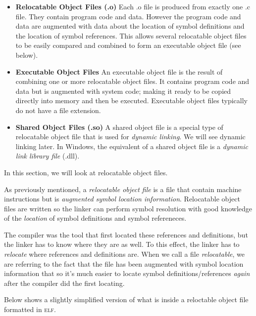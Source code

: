 \begin{itemize}   
\renewcommand{\labelitemi}{$\Box$}
\item \textbf{Relocatable Object Files (.o)} 
Each .o file is produced from exactly one .c file. They contain program code and data. 
However the program code and data are augmented with data about the location of symbol 
definitions and the location of symbol references. 
This allows several relocatable object files to be easily compared and combined to form an 
executable object file (see below).
\item \textbf{Executable Object Files} 
An executable object file is the result of combining one or more relocatable object files. 
It contains program code and data but is augmented with 
system code; making it ready to be copied directly into memory and then be executed. 
Executable object files typically do not have a file extension. 
\item \textbf{Shared Object Files (.so)} 
A shared object file is a special type of relocatable object 
file that is used for \textit{dynamic linking}. We will see dynamic linking later. 
In Windows, the equivalent of a shared object file is a \textit{dynamic link library file} (.dll).  
\end{itemize}


In this section, we will look at relocatable object files. 

As previously mentioned, 
a \textit{relocatable object file} is a file that contain machine instructions but is
\textit{augmented symbol location information}. Relocatable object files are written
so the linker can perform symbol resolution with good knowledge of the \textit{location} 
of symbol definitions and symbol refereneces.



The compiler was the tool that first located these references and definitions, 
but the linker has to know where they are as well. To this effect, the linker 
has to \textit{relocate} where references and definitions are. When we 
call a file \textit{relocatable}, we are referring to the fact that the file 
has been augmented with symbol location information that so it's much easier 
to locate symbol definitions/references \textit{again} 
after the compiler did the first locating.


Below shows a slightly simplified version of what is inside 
a reloctable object file formatted in \textsc{elf}. 


